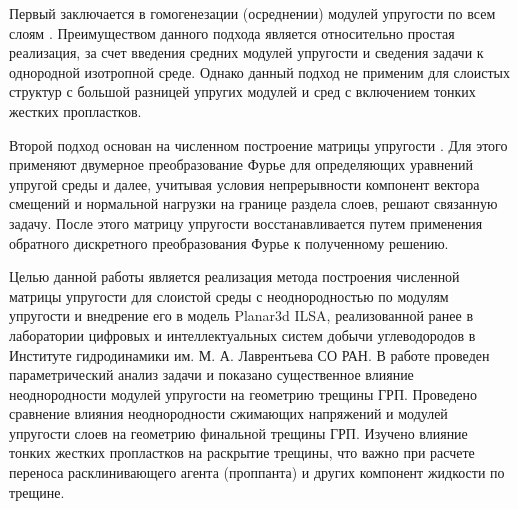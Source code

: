 Первый заключается в гомогенезации (осреднении) модулей упругости по всем слоям \cite{DONTSOV2021108144}. Преимуществом данного подхода является относительно простая реализация, за счет введения средних модулей упругости и сведения задачи к однородной изотропной среде. Однако данный подход не применим для слоистых структур с большой разницей упругих модулей и сред с включением тонких жестких пропластков.

Второй подход основан на численном построение матрицы упругости \cite{Siebrits_Peirce_2002,Peirce2001TheSF,Peirce2001UniformAA,Linkov1992}. Для этого применяют двумерное преобразование Фурье для определяющих уравнений упругой среды и далее, учитывая условия непрерывности компонент вектора смещений и нормальной нагрузки на границе раздела слоев, решают связанную задачу. После этого матрицу упругости восстанавливается путем применения обратного дискретного преобразования Фурье к полученному решению.

Целью данной работы является реализация метода построения численной матрицы упругости для слоистой среды с неоднородностью по модулям упругости и внедрение его в модель Planar3d ILSA, реализованной ранее в лаборатории цифровых и интеллектуальных систем добычи углеводородов в Институте гидродинамики им. М. А. Лаврентьева СО РАН. В работе проведен параметрический анализ задачи и показано существенное влияние неоднородности модулей упругости на геометрию трещины ГРП. Проведено сравнение влияния неоднородности сжимающих напряжений и модулей упругости слоев на геометрию финальной трещины ГРП. Изучено влияние тонких жестких пропластков на раскрытие трещины, что важно при расчете переноса расклинивающего агента (проппанта) и других компонент жидкости по трещине.


\clearpage